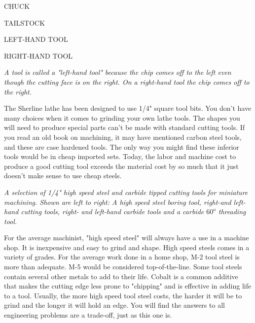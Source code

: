 \bigskip
CHUCK

TAILSTOCK

LEFT-HAND TOOL

RIGHT-HAND TOOL

\bigskip

\textit{A tool is called a "left-hand tool" because the chip comes off to the
left even though the cutting face is on the right. On a right-hand tool the chip
comes off to the right.}


The Sherline lathe has been designed to use 1/4" square tool bits. You don't
have many choices when it comes to grinding your own lathe tools. The shapes you
will need to produce special parts can't be made with standard cutting tools. If
you read an old book on machining, it may have mentioned carbon steel tools, and
these are case hardened tools. The only way you might find these inferior tools
would be in cheap imported sets. Today, the labor and machine cost to produce a
good cutting tool exceeds the material cost by so much that it just doesn't make
sense to use cheap steels.

\bigskip
\textit{A selection of 1/4" high speed steel and carbide tipped cutting tools
for miniature machining. Shown are left to right: A high speed steel boring
tool, right-and left-hand cutting tools, right- and left-hand carbide tools and
a carbide $60^o$ threading tool.}


For the average machinist, "high speed steel" will always have a use in a
machine shop. It is inexpensive and easy to grind and shape. High speed steels
comes in a variety of grades. For the average work done in a home shop, M-2 tool
steel is more than adequate. M-5 would be considered top-of-the-line. Some tool
steels contain several other metals to add to their life. Cobalt is a common
additive that makes the cutting edge less prone to "chipping" and is effective
in adding life to a tool. Usually, the more high speed tool steel costs, the
harder it will be to grind and the longer it will hold an edge. You will find
the answers to all engineering problems are a trade-off, just as this one is.


